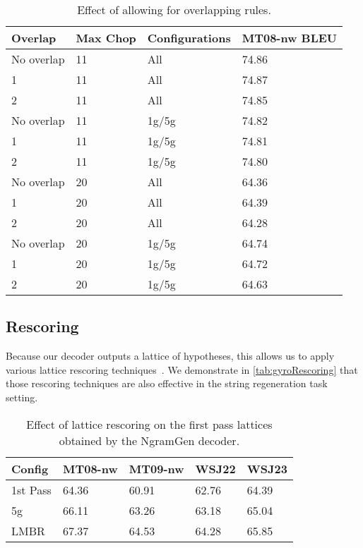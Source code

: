 \begin{table}
  \begin{center}
  \begin{tabular}{l|l|l|l}
    Overlap & Max Chop &  Configurations & MT08-nw BLEU \\
    \hline
    No overlap & 11 & All & 74.86 \\
    1          & 11 & All & 74.87 \\
    2          & 11 & All & 74.85 \\
    \hline
    No overlap & 11 & 1g/5g & 74.82 \\
    1          & 11 & 1g/5g & 74.81 \\
    2          & 11 & 1g/5g & 74.80 \\
    \hline
    No overlap & 20 & All & 64.36 \\
    1          & 20 & All & 64.39 \\
    2          & 20 & All & 64.28 \\
    \hline
    No overlap & 20 & 1g/5g & 64.74 \\
    1          & 20 & 1g/5g & 64.72 \\
    2          & 20 & 1g/5g & 64.63 \\
  \end{tabular}
  \caption{Effect of allowing for overlapping rules.}
  \label{tab:overlap}
  \end{center}
\end{table}

\subsection{Rescoring}

Because our decoder outputs a lattice of hypotheses, this
allows us to apply various lattice rescoring
techniques~\citep{blackwood:2010:PHD}.
We demonstrate in \autoref{tab:gyroRescoring}
that those rescoring techniques are also effective in the
string regeneration task setting.
%
\begin{table}
  \begin{center}
  \begin{tabular}{l|l|l|l|l}
    Config & MT08-nw & MT09-nw & WSJ22 & WSJ23 \\
    \hline
    1st Pass & 64.36 & 60.91 & 62.76 & 64.39 \\
    5g       & 66.11 & 63.26 & 63.18 & 65.04 \\
    LMBR     & 67.37 & 64.53 & 64.28 & 65.85 \\
  \end{tabular}
  \caption{Effect of lattice rescoring on the first pass lattices obtained
  by the NgramGen decoder.}
  \label{tab:gyroRescoring}
  \end{center}
\end{table}

